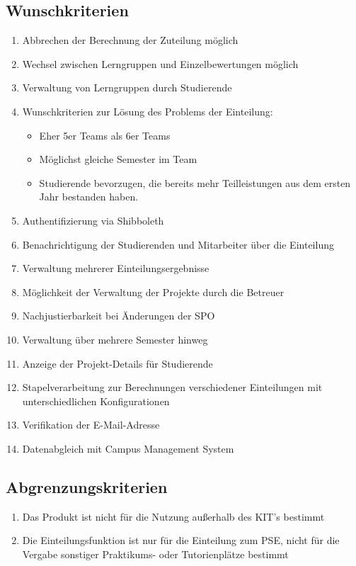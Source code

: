 \documentclass[parskip=full]{scrartcl}
\newcommand{\swtLabel}[1]{\textbf{\textbackslash #1\arabic*0\textbackslash}}
\begin{document}
\subsection{Wunschkriterien}
\begin{enumerate}[label=\swtLabel{W}]
  \item Abbrechen der Berechnung der Zuteilung möglich 
    \item Wechsel zwischen Lerngruppen und 
    Einzelbewertungen möglich %
    \item Verwaltung von Lerngruppen durch Studierende
    \item Wunschkriterien zur Lösung des Problems der Einteilung:
    \begin{itemize}
        \item Eher 5er Teams als 6er Teams
        \item Möglichst gleiche Semester im Team
        \item Studierende bevorzugen, die bereits mehr Teilleistungen aus dem
        ersten Jahr bestanden haben.
    \end{itemize}    
    \item Authentifizierung via Shibboleth
    \item Benachrichtigung der Studierenden und Mitarbeiter über die Einteilung
    \item Verwaltung mehrerer Einteilungsergebnisse
    \item Möglichkeit der Verwaltung der Projekte durch die Betreuer  %
    \item Nachjustierbarkeit bei Änderungen der SPO %
    \item Verwaltung über mehrere Semester hinweg
    \item Anzeige der Projekt-Details für Studierende
    \item Stapelverarbeitung zur Berechnungen verschiedener Einteilungen mit
    unterschiedlichen Konfigurationen
    \item Verifikation der E-Mail-Adresse
    \item Datenabgleich mit Campus Management System %
    
    
    
\end{enumerate}

\subsection{Abgrenzungskriterien}
\begin{enumerate}[label=\swtLabel{A}]
 
  \item Das Produkt ist nicht für die Nutzung außerhalb des KIT's bestimmt

\item Die Einteilungsfunktion ist nur für die Einteilung zum PSE, nicht
für die Vergabe sonstiger Praktikums- oder Tutorienplätze bestimmt
  
\end{enumerate}
\end{document}
